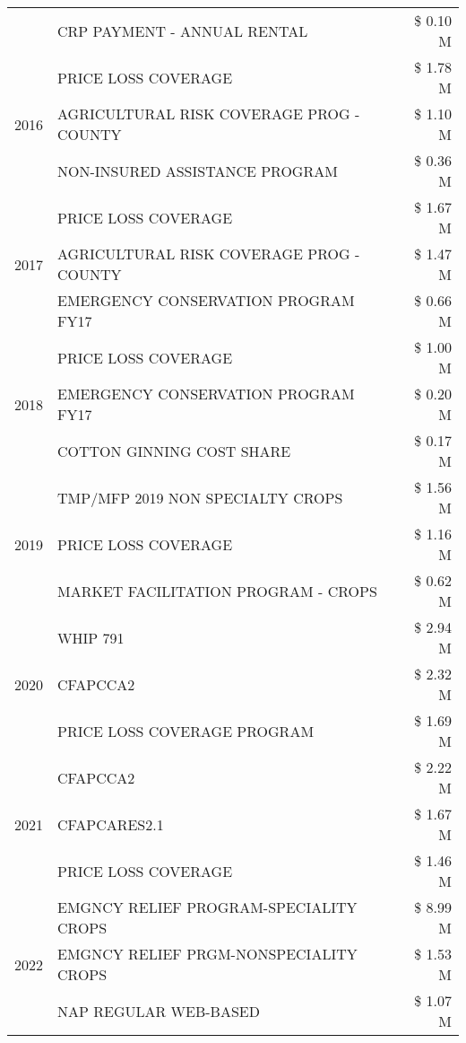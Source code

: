 \begin{tabular}{llr}
 & CRP PAYMENT - ANNUAL RENTAL & \$ 0.10 M \\
\cline{1-3}
\multirow[t]{3}{*}{2016} & PRICE LOSS COVERAGE & \$ 1.78 M \\
 & AGRICULTURAL RISK COVERAGE PROG - COUNTY & \$ 1.10 M \\
 & NON-INSURED ASSISTANCE PROGRAM & \$ 0.36 M \\
\cline{1-3}
\multirow[t]{3}{*}{2017} & PRICE LOSS COVERAGE & \$ 1.67 M \\
 & AGRICULTURAL RISK COVERAGE PROG - COUNTY & \$ 1.47 M \\
 & EMERGENCY CONSERVATION PROGRAM FY17 & \$ 0.66 M \\
\cline{1-3}
\multirow[t]{3}{*}{2018} & PRICE LOSS COVERAGE & \$ 1.00 M \\
 & EMERGENCY CONSERVATION PROGRAM FY17 & \$ 0.20 M \\
 & COTTON GINNING COST SHARE & \$ 0.17 M \\
\cline{1-3}
\multirow[t]{3}{*}{2019} & TMP/MFP 2019 NON SPECIALTY CROPS & \$ 1.56 M \\
 & PRICE LOSS COVERAGE & \$ 1.16 M \\
 & MARKET FACILITATION PROGRAM - CROPS & \$ 0.62 M \\
\cline{1-3}
\multirow[t]{3}{*}{2020} & WHIP 791 & \$ 2.94 M \\
 & CFAPCCA2 & \$ 2.32 M \\
 & PRICE LOSS COVERAGE PROGRAM & \$ 1.69 M \\
\cline{1-3}
\multirow[t]{3}{*}{2021} & CFAPCCA2 & \$ 2.22 M \\
 & CFAPCARES2.1 & \$ 1.67 M \\
 & PRICE LOSS COVERAGE & \$ 1.46 M \\
\cline{1-3}
\multirow[t]{3}{*}{2022} & EMGNCY RELIEF PROGRAM-SPECIALITY CROPS & \$ 8.99 M \\
 & EMGNCY RELIEF PRGM-NONSPECIALITY CROPS & \$ 1.53 M \\
 & NAP REGULAR WEB-BASED & \$ 1.07 M \\
\cline{1-3}
\bottomrule
\end{tabular}
